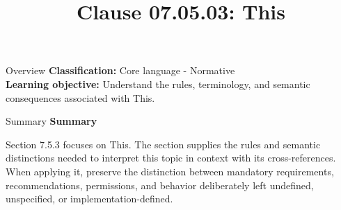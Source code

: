 \documentclass[10pt,letterpaper]{article}
\title{Clause 07.05.03: This}
\author{}
\date{}
\begin{document}
\maketitle
\begin{CornellOverviewBox}{Overview}
\textbf{Classification:} Core language - Normative\\[2pt]
\textbf{Learning objective:} Understand the rules, terminology, and semantic consequences associated with This.
\end{CornellOverviewBox}\begin{CornellSummaryBox}{Summary}
{\sffamily\bfseries\color{Accent} Summary}\par\vspace{3pt}Section 7.5.3 focuses on This. The section supplies the rules and semantic distinctions needed to interpret this topic in context with its cross-references. When applying it, preserve the distinction between mandatory requirements, recommendations, permissions, and behavior deliberately left undefined, unspecified, or implementation-defined.
\end{CornellSummaryBox}
\end{document}
